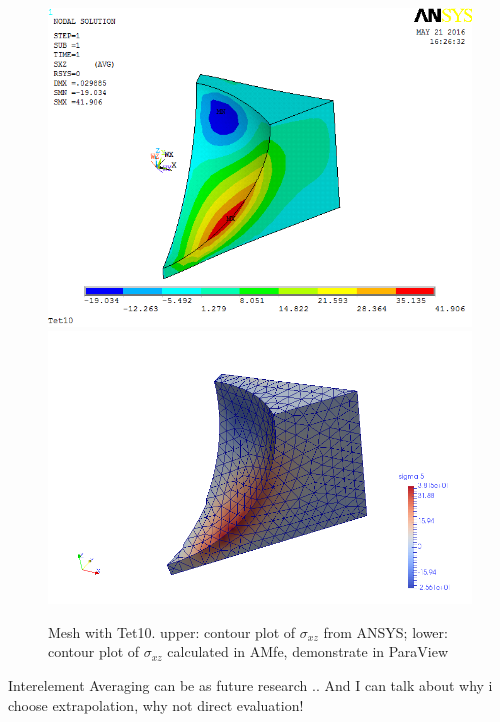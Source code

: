 \begin{figure}[htbp]
	\begin{center}
		\includegraphics[width=13cm,clip]{Tet10_Sxz.png} 		
		\includegraphics[width=13cm,clip]{Tet10_Sxz_P.png} 		
		\caption{Mesh with Tet10. upper: contour plot of $\sigma_{xz}$ from ANSYS; lower: contour plot of $\sigma_{xz}$ calculated in AMfe, demonstrate in ParaView} \label{fig: Tet10_Sxz}
	\end{center}
\end{figure}

\clearpage 




\cite[p. 18]{bibid}
Interelement Averaging can be as future research ..
And I can talk about why i choose extrapolation, why not direct evaluation!
\cite[p. 1-10]{Johannes} \cite{Felippa}